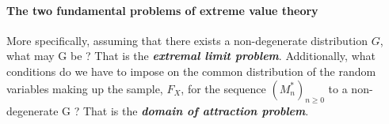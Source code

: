 \paragraph{The two fundamental problems of extreme value theory} More specifically, assuming that there exists a non-degenerate distribution $G$, what may G be ? That is the \textit{\textbf{extremal limit problem}}. Additionally, what conditions do we have to impose on the common distribution of the random variables making up the sample, $F_X$, for the sequence $(M^{*}_n)_{n \ge 0}$ to a non-degenerate G ? That is the \textit{\textbf{domain of attraction problem}}.



